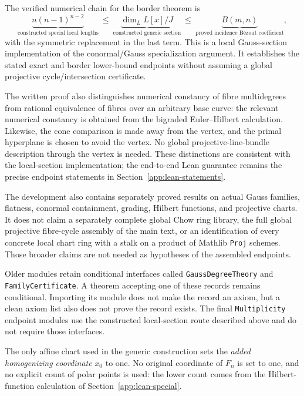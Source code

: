 The verified numerical chain for the border theorem is
\[
 \underbrace{n(n-1)^{n-2}}_{\text{constructed special local lengths}}
 \ \leq\
 \underbrace{\dim_L L[x]/J}_{\text{constructed generic section}}
 \ \leq\
 \underbrace{B(m,n)}_{\text{proved incidence B\'ezout coefficient}},
\]
with the symmetric replacement in the last term.  This is a local
Gauss-section implementation of the conormal/Gauss specialization
argument.  It establishes the stated exact and border lower-bound
endpoints without assuming a global projective cycle/intersection
certificate.

The written proof also distinguishes numerical
constancy of fibre multidegrees from rational equivalence of fibres over
an arbitrary base curve: the relevant numerical constancy is obtained
from the bigraded Euler--Hilbert calculation.  Likewise, the cone
comparison is made away from the vertex, and the primal hyperplane is
chosen to avoid the vertex.  No global projective-line-bundle description
through the vertex is needed.  These distinctions are consistent with
the local-section implementation; the end-to-end Lean guarantee remains
the precise endpoint statements in Section~\ref{app:lean-statements}.

The development also contains separately proved results on actual Gauss
families, flatness, conormal containment, grading, Hilbert functions, and
projective charts.  It does not claim a separately complete global Chow
ring library, the full global projective fibre-cycle assembly of the main
text, or an identification of every concrete local chart ring with a
stalk on a product of Mathlib \nolinkurl{Proj} schemes.  Those broader
claims are not needed as hypotheses of the assembled endpoints.

Older modules retain conditional interfaces called
\nolinkurl{GaussDegreeTheory} and \nolinkurl{FamilyCertificate}.  A theorem
accepting one of these records remains conditional.  Importing its module
does not make the record an axiom, but a clean axiom list also does not
prove the record exists.  The final \nolinkurl{Multiplicity} endpoint
modules use the constructed local-section route described above and do
not require those interfaces.

The only affine chart used in the generic construction sets the
\emph{added homogenizing coordinate} $x_0$ to one.  No original coordinate
of $F_n$ is set to one, and no explicit count of polar points is used: the
lower count comes from the Hilbert-function calculation of
Section~\ref{app:lean-special}.

